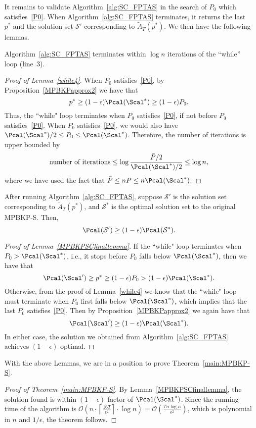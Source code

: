 It remains to validate Algorithm~\ref{alg:SC_FPTAS} in the search of $P_0$ which satisfies~\eqref{P0}. When Algorithm~\ref{alg:SC_FPTAS} terminates, it returns the last $p^*$ and the solution set $\mathcal{S}'$ corresponding to $\widetilde{A}_{T}(p^*)$. We then have the following lemmas. %
\begin{lemma}\label{while4}
Algorithm~\ref{alg:SC_FPTAS} terminates within $\log n$ iterations of the ``while'' loop (line~3).
\end{lemma}
\begin{proof}[Proof of Lemma~\ref{while4}]
	When $P_0$ satisfies~\eqref{P0}, by Proposition~\ref{MPBKPapprox2} we have that
	$$
	p^*\ge (1-\epsilon) \Pcal(\Scal^*)\ge (1-\epsilon)P_0.
	$$
	Thus, the ``while" loop terminates when $P_0$ satisfies~\eqref{P0}, if not before $P_0$ satisfies~\eqref{P0}. When $P_0$ satisfies~\eqref{P0}, we would also have $\Pcal(\Scal^*)/2\le P_0\le \Pcal(\Scal^*)$. Therefore, the number of iterations is upper bounded by
	$$
	\text{number of iterations}\le \log\frac{\bar{P}/2}{\Pcal(\Scal^*)/2}\le \log n,
	$$
	where we have used the fact that $\bar{P}\le nP\le n\Pcal(\Scal^*)$.
\end{proof}

\begin{lemma}\label{MPBKPSCfinallemma}
After running Algorithm~\ref{alg:SC_FPTAS}, suppose $\mathcal{S}'$ is the solution set corresponding to $\widetilde{A}_{T}(p^*)$, and $\mathcal{S}^*$ is the optimal solution set to the original MPBKP-S.  Then,
$$
\Pcal(\mathcal{S}')\geq  (1-\epsilon)\Pcal(\mathcal{S}^*).
$$
\end{lemma}
\begin{proof}[Proof of Lemma~\ref{MPBKPSCfinallemma}]
	If the ``while" loop terminates when $P_0>\Pcal(\Scal^*)$, i.e., it stops before $P_0$ falls below $\Pcal(\Scal^*)$, then we have that
	$$
	\Pcal(\Scal')\ge p^*\ge (1-\epsilon)P_0>(1-\epsilon)\Pcal(\Scal^*).
	$$
	Otherwise, from the proof of Lemma~\ref{while4} we know that the ``while" loop must terminate when $P_0$ first falls below $\Pcal(\Scal^*)$, which implies that the last $P_0$ satisfies~\eqref{P0}. Then by Proposition~\ref{MPBKPapprox2} we again have that 
	$$
	\Pcal(\Scal')\ge (1-\epsilon)\Pcal(\Scal^*).
	$$
	In either case, the solution we obtained from Algorithm~\ref{alg:SC_FPTAS} achieves $(1-\epsilon)$ optimal.
\end{proof}

With the above Lemmas, we are in a position to prove Theorem~\ref{main:MPBKP-S}.
\begin{proof}[Proof of Theorem~\ref{main:MPBKP-S}]
By Lemma~\ref{MPBKPSCfinallemma}, the solution found is within $(1-\epsilon)$ factor of $\Pcal(\Scal^*)$. Since the running time of the algorithm is $\mathcal{O}\left(n\cdot \left\lceil\frac{16T}{\epsilon^2}\right\rceil\cdot \log n\right)=\mathcal{O}\left(\frac{Tn\log n}{\epsilon^2}\right)$, which is polynomial in $n$ and $1/\epsilon$, the theorem follows. 
\end{proof}






